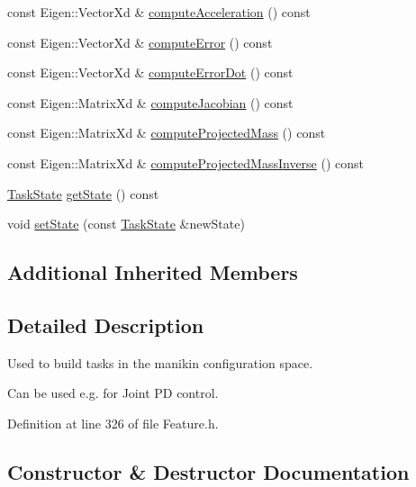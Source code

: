 \begin{DoxyCompactItemize}
\item 
const Eigen\+::\+Vector\+Xd \& \hyperlink{classocra_1_1FullStateFeature_a7e668c7fa50e2ee6947c2f97dcd18e4e}{compute\+Acceleration} () const
\item 
const Eigen\+::\+Vector\+Xd \& \hyperlink{classocra_1_1FullStateFeature_a8a8e1a72f3aa7b417b5d347eaee69ebb}{compute\+Error} () const
\item 
const Eigen\+::\+Vector\+Xd \& \hyperlink{classocra_1_1FullStateFeature_af5d860acbb9dc600a432fcba952f95a7}{compute\+Error\+Dot} () const
\item 
const Eigen\+::\+Matrix\+Xd \& \hyperlink{classocra_1_1FullStateFeature_a9f1b50d69d0a5220286e9a7c3fb54835}{compute\+Jacobian} () const
\item 
const Eigen\+::\+Matrix\+Xd \& \hyperlink{classocra_1_1FullStateFeature_a5f2a243a7df81e7843bc258bef9cfae8}{compute\+Projected\+Mass} () const
\item 
const Eigen\+::\+Matrix\+Xd \& \hyperlink{classocra_1_1FullStateFeature_a1b3231544c745efacc3665f567bb4402}{compute\+Projected\+Mass\+Inverse} () const
\item 
\hyperlink{classocra_1_1TaskState}{Task\+State} \hyperlink{classocra_1_1FullStateFeature_aa0e23c8feabb2e6855404cd90032ffbc}{get\+State} () const
\item 
void \hyperlink{classocra_1_1FullStateFeature_a77263aff16d7078ac19dc2eb6a196a65}{set\+State} (const \hyperlink{classocra_1_1TaskState}{Task\+State} \&new\+State)
\end{DoxyCompactItemize}
\subsection*{Additional Inherited Members}


\subsection{Detailed Description}
Used to build tasks in the manikin configuration space. 

Can be used e.\+g. for Joint PD control. 

Definition at line 326 of file Feature.\+h.



\subsection{Constructor \& Destructor Documentation}
\hypertarget{classocra_1_1FullStateFeature_a58460a5615fefc0b12b5a04767ea2386}{}\label{classocra_1_1FullStateFeature_a58460a5615fefc0b12b5a04767ea2386} 
